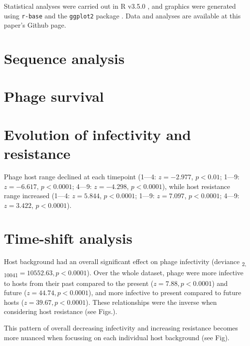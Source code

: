 \documentclass [12pt, a4paper, twoside]  {article}
\newcommand{\sub}{\textsubscript}
\begin{document}
Statistical analyses were carried out in R v3.5.0 \citep{R}, and graphics were generated using \texttt{r-base} and the \texttt{ggplot2} package \citep{ggplot2}. Data and analyses are available at this paper's Github page.

\section*{Sequence analysis}


\section*{Phage survival}


\section*{Evolution of infectivity and resistance}
Phage host range declined at each timepoint (1---4: $z = -2.977$, $p < 0.01$; 1---9: $z=-6.617$, $p < 0.0001$; 4---9: $z = -4.298$, $p < 0.0001$), while host resistance range increased (1---4: $z = 5.844$, $p < 0.0001$; 1---9: $z=7.097$, $p < 0.0001$; 4---9: $z = 3.422$, $p < 0.0001$). 

\section*{Time-shift analysis}
Host background had an overall significant effect on phage infectivity (deviance \sub{2, 10041}$=10552.63, p<0.0001$). Over the whole dataset, phage were more infective to hosts from their past compared to the present ($z = 7.88, p<0.0001$) and future ($z = 44.74, p<0.0001$), and more infective to present compared to future hosts ($z=39.67, p<0.0001$). These relationships were the inverse when considering host resistance (see Figs.). 

This pattern of overall decreasing infectivity and increasing resistance becomes more nuanced when focussing on each individual host background (see Fig). 
\end{document}

